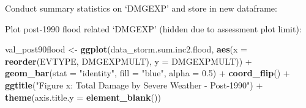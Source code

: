 \documentclass[]{article}
\newenvironment{Shaded}{\begin{snugshade}}{\end{snugshade}}
\newcommand{\KeywordTok}[1]{\textcolor[rgb]{0.13,0.29,0.53}{\textbf{{#1}}}}
\newcommand{\DataTypeTok}[1]{\textcolor[rgb]{0.13,0.29,0.53}{{#1}}}
\newcommand{\DecValTok}[1]{\textcolor[rgb]{0.00,0.00,0.81}{{#1}}}
\newcommand{\FloatTok}[1]{\textcolor[rgb]{0.00,0.00,0.81}{{#1}}}
\newcommand{\StringTok}[1]{\textcolor[rgb]{0.31,0.60,0.02}{{#1}}}
\newcommand{\OtherTok}[1]{\textcolor[rgb]{0.56,0.35,0.01}{{#1}}}
\newcommand{\NormalTok}[1]{{#1}}
\begin{document}
Conduct summary statistics on `DMGEXP' and store in new dataframe:

\begin{Shaded}
\end{Shaded}

Plot post-1990 flood related `DMGEXP' (hidden due to assessment plot
limit):

\begin{Shaded}
\begin{Highlighting}[]
\NormalTok{val_post90flood <-}\StringTok{ }\KeywordTok{ggplot}\NormalTok{(data_storm.sum.inc2.flood, }\KeywordTok{aes}\NormalTok{(}\DataTypeTok{x =} \KeywordTok{reorder}\NormalTok{(EVTYPE, DMGEXPMULT), }\DataTypeTok{y =} \NormalTok{DMGEXPMULT)) +}
\StringTok{  }\KeywordTok{geom_bar}\NormalTok{(}\DataTypeTok{stat =} \StringTok{"identity"}\NormalTok{, }\DataTypeTok{fill =} \StringTok{"blue"}\NormalTok{, }\DataTypeTok{alpha =} \FloatTok{0.5}\NormalTok{) +}
\StringTok{  }\KeywordTok{coord_flip}\NormalTok{() +}
\StringTok{  }\KeywordTok{ggtitle}\NormalTok{(}\StringTok{"Figure x: Total Damage by Severe Weather - Post-1990"}\NormalTok{) +}
\StringTok{  }\KeywordTok{theme}\NormalTok{(}\DataTypeTok{axis.title.y =} \KeywordTok{element_blank}\NormalTok{())}
\end{Highlighting}
\end{Shaded}
\end{document}
